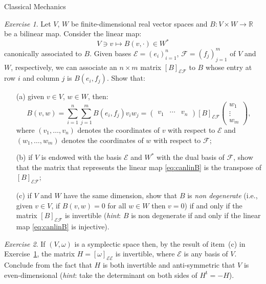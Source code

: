 \documentclass[oneside,a4paper,11pt]{amsbook}
\newcommand{\R}{\mathds R}
\newcommand{\transp}{\mathrm t}
\theoremstyle{remark}\newtheorem{exercise}{Exercise}[chapter]
\theoremstyle{plain}\newtheorem{teo}{Theorem}[section]
\theoremstyle{plain}\newtheorem{lem}[teo]{Lemma}
\theoremstyle{plain}\newtheorem{prop}[teo]{Proposition}
\theoremstyle{plain}\newtheorem{cor}[teo]{Corollary}
\theoremstyle{definition}\newtheorem{defin}[teo]{Definition}
\theoremstyle{remark}\newtheorem{rem}[teo]{Remark}
\theoremstyle{definition}\newtheorem{notation}[teo]{Notation}
\theoremstyle{definition}\newtheorem{convention}[teo]{Convention}
\theoremstyle{definition}\newtheorem{example}[teo]{Example}
\numberwithin{section}{chapter}
\numberwithin{equation}{section}
\begin{document}
\begin{chapter}{Classical Mechanics}
\begin{exercise}\label{exe:bilinbasis}
Let $V$, $W$ be finite-dimensional real vector spaces and $B:V\times W\to\R$ be a bilinear map. Consider the linear map:
\begin{equation}\label{eq:canlinB}
V\ni v\longmapsto B(v,\cdot)\in W^*
\end{equation}
canonically associated to $B$. Given bases $\mathcal E=(e_i)_{i=1}^n$, $\mathcal F=(f_j)_{j=1}^m$ of $V$ and $W$,
respectively, we can associate an $n\times m$ matrix $[B]_{\mathcal E\mathcal F}$ to $B$ whose entry at row
$i$ and column $j$ is $B(e_i,f_j)$. Show that:
\begin{itemize}
\item[(a)] given $v\in V$, $w\in W$, then:
\[B(v,w)=\sum_{i=1}^n\sum_{j=1}^mB(e_i,f_j)v_iw_j=\begin{pmatrix}v_1&\cdots&v_n\end{pmatrix}
[B]_{\mathcal E\mathcal F}\begin{pmatrix}w_1\\\vdots\\w_m\end{pmatrix},\]
where $(v_1,\ldots,v_n)$ denotes the coordinates of $v$ with respect to $\mathcal E$ and $(w_1,\ldots,w_m)$
denotes the coordinates of $w$ with respect to $\mathcal F$;
\item[(b)] if $V$ is endowed with the basis $\mathcal E$ and $W^*$ with the dual basis of $\mathcal F$, show that
the matrix that represents the linear map \eqref{eq:canlinB} is the transpose of $[B]_{\mathcal E\mathcal F}$;
\item[(c)] if $V$ and $W$ have the same dimension, show that $B$ is {\em non degenerate\/} (i.e., given $v\in V$,
if $B(v,w)=0$ for all $w\in W$ then $v=0$) if and only if the matrix $[B]_{\mathcal E\mathcal F}$ is invertible
({\em hint}: $B$ is non degenerate if and only if the linear map \eqref{eq:canlinB} is injective).
\end{itemize}
\end{exercise}

\begin{exercise}\label{exe:proofeven}
If $(V,\omega)$ is a symplectic space then, by the result of item~(c) in Exercise~\ref{exe:bilinbasis},
the matrix $H=[\omega]_{\mathcal E\mathcal E}$ is invertible, where $\mathcal E$ is any basis of $V$. Conclude
from the fact that $H$ is both invertible and anti-symmetric that $V$ is even-dimensional ({\em hint}: take the
determinant on both sides of $H^\transp=-H$).
\end{exercise}


\end{chapter}
\end{document}
